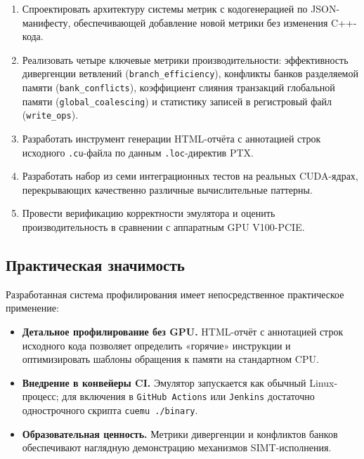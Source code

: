 \begin{enumerate}
  \item Спроектировать архитектуру системы метрик с кодогенерацией по JSON-манифесту,
        обеспечивающей добавление новой метрики без изменения C++-кода.
  \item Реализовать четыре ключевые метрики производительности:
        эффективность дивергенции ветвлений (\texttt{branch\_efficiency}),
        конфликты банков разделяемой памяти (\texttt{bank\_conflicts}),
        коэффициент слияния транзакций глобальной памяти (\texttt{global\_coalescing})
        и статистику записей в регистровый файл (\texttt{write\_ops}).
  \item Разработать инструмент генерации HTML-отчёта с аннотацией строк
        исходного \texttt{.cu}-файла по данным \texttt{.loc}-директив PTX.
  \item Разработать набор из семи интеграционных тестов на реальных CUDA-ядрах,
        перекрывающих качественно различные вычислительные паттерны.
  \item Провести верификацию корректности эмулятора и оценить производительность
        в сравнении с аппаратным GPU V100-PCIE.
\end{enumerate}

\subsection{Практическая значимость}

Разработанная система профилирования имеет непосредственное практическое применение:

\begin{itemize}
  \item \textbf{Детальное профилирование без GPU.} HTML-отчёт с аннотацией
        строк исходного кода позволяет определить «горячие» инструкции
        и оптимизировать шаблоны обращения к памяти на стандартном CPU.
  \item \textbf{Внедрение в конвейеры CI.} Эмулятор запускается как обычный
        Linux-процесс; для включения в \texttt{GitHub Actions} или
        \texttt{Jenkins} достаточно однострочного скрипта \texttt{cuemu ./binary}.
  \item \textbf{Образовательная ценность.} Метрики дивергенции и конфликтов
        банков обеспечивают наглядную демонстрацию механизмов SIMT-исполнения.
\end{itemize}

\newpage
